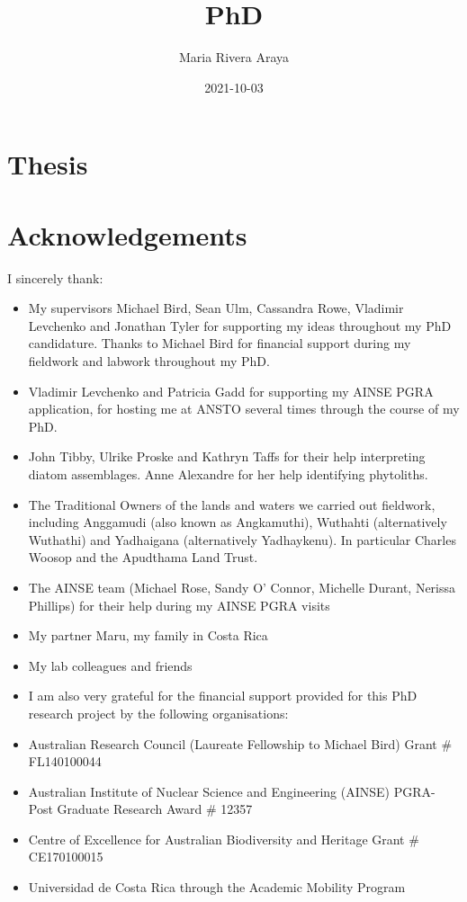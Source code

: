 \documentclass[
  12pt,
]{book}
\title{PhD}
\author{Maria Rivera Araya}
\date{2021-10-03}
\begin{document}
\maketitle

{
\setcounter{tocdepth}{1}
\tableofcontents
}
\hypertarget{thesis}{%
\chapter{Thesis}\label{thesis}}

\hypertarget{acknowledgements}{%
\chapter*{Acknowledgements}\label{acknowledgements}}

I sincerely thank:

\begin{itemize}
\item
  My supervisors Michael Bird, Sean Ulm, Cassandra Rowe, Vladimir Levchenko and Jonathan Tyler for supporting my ideas throughout my PhD candidature. Thanks to Michael Bird for financial support during my fieldwork and labwork throughout my PhD.
\item
  Vladimir Levchenko and Patricia Gadd for supporting my AINSE PGRA application, for hosting me at ANSTO several times through the course of my PhD.
\item
  John Tibby, Ulrike Proske and Kathryn Taffs for their help interpreting diatom assemblages. Anne Alexandre for her help identifying phytoliths.
\item
  The Traditional Owners of the lands and waters we carried out fieldwork, including Anggamudi (also known as Angkamuthi), Wuthahti (alternatively Wuthathi) and Yadhaigana (alternatively Yadhaykenu). In particular Charles Woosop and the Apudthama Land Trust.
\item
  The AINSE team (Michael Rose, Sandy O' Connor, Michelle Durant, Nerissa Phillips) for their help during my AINSE PGRA visits
\item
  My partner Maru, my family in Costa Rica
\item
  My lab colleagues and friends
\item
  I am also very grateful for the financial support provided for this PhD research project by the following organisations:
\item
  Australian Research Council (Laureate Fellowship to Michael Bird)
  Grant \# FL140100044
\item
  Australian Institute of Nuclear Science and Engineering (AINSE)
  PGRA- Post Graduate Research Award \# 12357
\item
  Centre of Excellence for Australian Biodiversity and Heritage
  Grant \# CE170100015
\item
  Universidad de Costa Rica through the Academic Mobility Program
\end{itemize}
\end{document}
